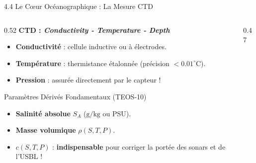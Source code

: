\begin{frame}{4.4 Le C{\oe}ur Océanographique : La Mesure CTD}
  \begin{columns}[c]
    \begin{column}{0.52\textwidth}
      \textbf{CTD : \textit{Conductivity - Temperature - Depth}}
      \scriptsize
      \begin{itemize}
        \item \textbf{Conductivité} : cellule inductive ou à électrodes.
        \item \textbf{Température} : thermistance étalonnée (précision $<0.01^\circ\text{C}$).
        \item \textbf{Pression} : assurée directement par le capteur  !
      \end{itemize}

      \vspace{0.2em}
      \begin{block}{Paramètres Dérivés Fondamentaux (TEOS-10)}
        \scriptsize
        \begin{itemize}
          \item \textbf{Salinité absolue} $S_A$ ($\text{g/kg}$ ou PSU).
          \item \textbf{Masse volumique} $\rho(S, T, P)$.
          \item {} $c(S, T, P)$ : \textbf{indispensable} pour corriger la portée des sonars et de l'USBL !
        \end{itemize}
      \end{block}
    \end{column}

    \begin{column}{0.47\textwidth}
      \begin{center}
\end{center}
\end{column}
\end{columns}
\end{frame}
